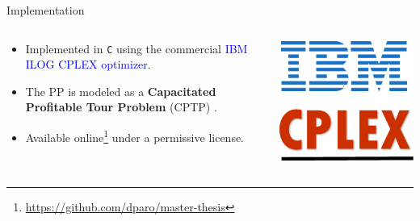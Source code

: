 \begin{frame}{Implementation}
	\begin{columns}
		\begin{column}{0.85\textwidth}
			\begin{itemize}
				\item Implemented in \texttt{C} using the commercial \textcolor{blue}{IBM ILOG CPLEX optimizer}.
				\item The PP is modeled as a \textbf{Capacitated Profitable Tour Problem} (CPTP) \parencite{jepsen2014}.
				\item Available online\footnote[1]{\url{https://github.com/dparo/master-thesis}} under a permissive license.
			\end{itemize}
		\end{column}
		\begin{column}{0.15\textwidth}
			\centering
			\includegraphics[width=\textwidth]{./Imgs/IBM-ILOG-CPLEX-logo.png}
		\end{column}
	\end{columns}

	\vspace{0.2cm}


\end{frame}

